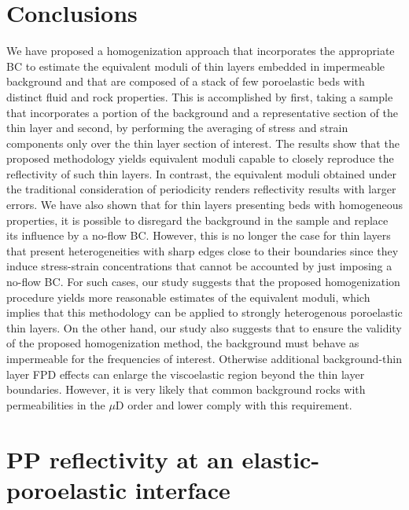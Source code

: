 \documentclass[draft]{agujournal2019}
\begin{document}
\section{Conclusions}
We have proposed a homogenization approach that incorporates the appropriate BC to estimate the equivalent moduli of thin layers embedded in impermeable background and that are composed of a stack of few poroelastic beds with distinct fluid and rock properties. This is accomplished by first, taking a sample that incorporates a portion of the background and a representative section of the thin layer and second, by performing the averaging of stress and strain components only over the thin layer section of interest.
The results show that the proposed methodology yields equivalent moduli capable to closely reproduce the reflectivity of such thin layers. In contrast, the equivalent moduli obtained under the traditional consideration of periodicity renders reflectivity results with larger errors. We  have also shown that for thin layers presenting beds with homogeneous properties, it is possible to disregard the background in the sample and replace its influence by a no-flow BC. However, this is no longer the case for thin layers that present heterogeneities with sharp edges close to their boundaries since they induce stress-strain concentrations that cannot be accounted by just imposing a no-flow BC. For such cases, our study suggests that the proposed homogenization procedure yields more reasonable estimates of the equivalent moduli, which implies that this methodology can be applied to strongly heterogenous poroelastic thin layers. On the other hand, our study also suggests that to ensure the validity of the proposed homogenization method, the background must behave as impermeable for the frequencies of interest. Otherwise additional background-thin layer FPD effects can enlarge the viscoelastic region beyond the thin layer boundaries. However, it is very likely that common background rocks with permeabilities in the $\mu$D order and lower comply with this requirement.



\appendix
\section{PP reflectivity  at an elastic-poroelastic interface}
\end{document}
